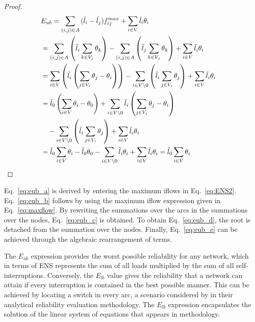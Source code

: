 \documentclass{article}
\begin{document}
\begin{proof}
\begin{subequations}
 	\begin{align} 
		\displaystyle &E_{ub} = \sum_{(i,j) \in A}{(\tilde{l}_i-\tilde{l}_j)f^{max}_{ij}} + \sum_{i \in V}{\tilde{l}_i\theta_{i}} \label{eq:eub_a}  \\
		&= \sum_{(i,j) \in A}{\left( \tilde{l}_i\sum_{k \in V_j}{\theta_k} \right)} - \sum_{(i,j) \in A}{\left( \tilde{l}_j\sum_{k \in V_j}{\theta_k} \right)} + \sum_{i \in V}{\tilde{l}_i\theta_{i}} \label{eq:eub_b}  \\
		&= \sum_{i \in V}{\left( \tilde{l}_i \left( \sum_{j \in V_i}{\theta_j} - \theta_i \right) \right)} - \sum_{i \in V \setminus {0}}{\left( \tilde{l}_i\sum_{j \in V_i}{\theta_j} \right)} + \sum_{i \in V}{\tilde{l}_i\theta_{i}} \label{eq:eub_c} \\
		&= \tilde{l}_0 \left( \sum_{i \in V}{\theta_i} - \theta_0 \right) + \sum_{i \in V \setminus {0}}{\tilde{l}_i \left( \sum_{j \in V_i}{\theta_j} - \theta_i \right) } \nonumber \\ 
		& \ \ \ - \sum_{i \in V \setminus {0}}{\left( \tilde{l}_i\sum_{j \in V_i}{\theta_j} \right)} + \sum_{i \in V}{\tilde{l}_i\theta_{i}} \label{eq:eub_d}  \\		
		&= \tilde{l}_0\sum_{i \in V}{\theta_i} - \tilde{l}_0\theta_0 - \sum_{i \in V \setminus {0}}{\tilde{l}_i\theta_i} + \sum_{i \in V}{\tilde{l}_i\theta_{i}}  = \tilde{l}_0\sum_{i \in V}{\theta_i} \label{eq:eub_e}
	\end{align}
\end{subequations}
\end{proof}

Eq.~\eqref{eq:eub_a} is derived by entering the maximum iflows in Eq.~\eqref{eq:ENS2}. Eq.~\eqref{eq:eub_b} follows by using the maximum iflow expression given in Eq.~\eqref{eq:maxflow}. By rewriting the summations over the arcs in the summations over the nodes, Eq.~\eqref{eq:eub_c} is obtained. To obtain Eq.~\eqref{eq:eub_d}, the root is detached from the summation over the nodes. Finally, Eq.~\eqref{eq:eub_e} can be achieved through the algebraic rearrangement of terms. 

The $E_{ub}$ expression provides the worst possible reliability for any network, which in terms of ENS represents the sum of all loads multiplied by the sum of all self-interruptions. Conversely, the $E_{lb}$ value gives the reliability that a network can attain if every interruption is contained in the best possible manner. This can be achieved by locating a switch in every arc, a scenario considered by \cite{TabaresEtal2019} in their analytical reliability evaluation methodology. The $E_{lb}$ expression encapsulates the solution of the linear system of equations that appears in \cite{TabaresEtal2019} methodology. 
\end{document}
